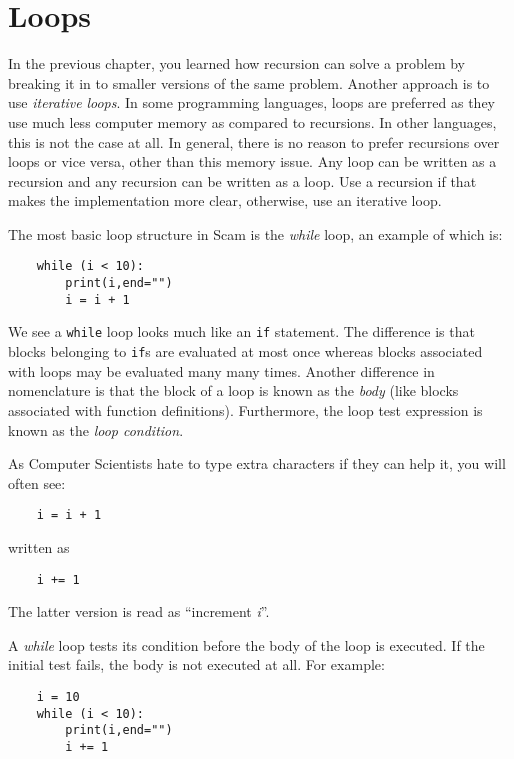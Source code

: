 \chapter{Loops}
\label{Loops}

In the previous chapter, you learned how recursion can
solve a problem by breaking it in to smaller versions
of the same problem. Another approach is to use
{\it iterative} {\it loops}. In some programming
languages, loops are preferred as they use much
less computer memory as compared to recursions.
In other languages, this is not the case at all.
In general, there
is no reason to prefer recursions over loops or vice versa,
other than this memory issue.
Any loop can be written as a recursion and any recursion
can be written as a loop.
Use a recursion if that makes the implementation
more clear, otherwise, use an iterative loop.

The most
basic loop structure in Scam is the {\it while} loop, an example of
which is:

\begin{verbatim}
    while (i < 10):
        print(i,end="")
        i = i + 1
\end{verbatim}

We see a {\tt while} loop looks much like an {\tt if}
statement.
The difference
is that blocks belonging to {\tt if}s are evaluated at most once whereas
blocks associated with loops may be evaluated many many times.
Another difference in nomenclature is that the block of a loop
is known as the {\it body} (like blocks associated with function
definitions). Furthermore, the loop test expression is known
as the {\it loop condition}.

As Computer Scientists hate to type extra characters if they can
help it, you will often see:

\begin{verbatim}
    i = i + 1
\end{verbatim}

written as

\begin{verbatim}
    i += 1
\end{verbatim}

The latter version is read as ``increment {\it i}''.

A {\it while} loop tests its condition before the body of the loop is
executed. If the initial test fails, the body is not executed at all. For
example:

\begin{verbatim}
    i = 10
    while (i < 10):
        print(i,end="")
        i += 1
\end{verbatim}

